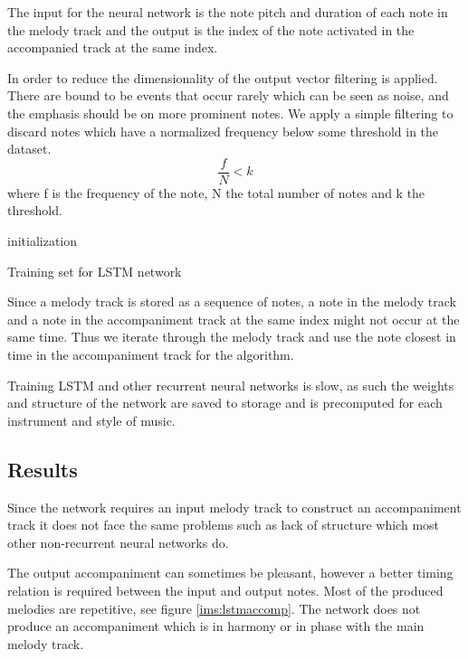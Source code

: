 The input for the neural network is the note pitch and duration of each note in the melody track and the output is the index of the note activated in the accompanied track at the same index.

In order to reduce the dimensionality of the output vector filtering is applied. There are bound to be events that occur rarely which can be seen as noise, and the emphasis should be on more prominent notes.
We apply a simple filtering to discard notes which have a normalized frequency below some threshold in the dataset.
\[ \frac{f}{N} < k \]
where f is the frequency of the note, N the total number of notes and k the threshold.

\begin{algorithm}
 initialization\;
 
\caption{Training set for LSTM network}
\end{algorithm}
Since a melody track is stored as a sequence of notes, a note in the melody track and a note in the accompaniment track at the same index might not occur at the same time. Thus we iterate through the melody track and use the note closest in time in the accompaniment track for the algorithm.

Training \ac{LSTM} and other recurrent neural networks is slow, as such the weights and structure of the network are saved to storage and is precomputed for each instrument and style of music.

\subsection{Results}
Since the network requires an input melody track to construct an accompaniment track it does not face the same problems such as lack of structure which most other non-recurrent neural networks do.

The output accompaniment can sometimes be pleasant, however a better timing relation is required between the input and output notes. Most of the produced melodies are repetitive, see figure \ref{ims:lstmaccomp}. The network does not produce an accompaniment which is in harmony or in phase with the main melody track.

